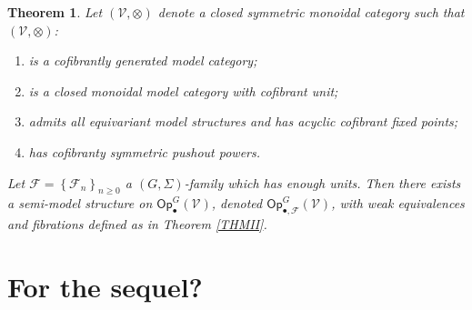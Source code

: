 \documentclass[a4paper,10pt
,draft
]{article}%
\numberwithin{equation}{section}
\numberwithin{figure}{section}
\newtheorem{theorem}[equation]{Theorem}%
\theoremstyle{definition} %
\newcommand{\set}[1]{\left\{#1\right\}}%
\newcommand{\Op}{\mathsf{Op}}%
\newcommand{\F}{\ensuremath{\mathcal F}}
\newcommand{\V}{\ensuremath{\mathcal V}}
\renewcommand{\O}{\ensuremath{\mathcal O}}
\newcommand{\1}{\ensuremath{\mathbbm 1}}%
\begin{document}
\begin{theorem}
      \label{THMII_S}
      Let $(\V,\otimes)$ denote a closed symmetric monoidal category such that
      $(\V, \otimes)$:
      \begin{enumerate}[label = (\roman*)]
      \item is a cofibrantly generated model category;
      \item is a closed monoidal model category with cofibrant unit;
      \item admits all equivariant model structures and has acyclic cofibrant fixed points;
      \item has cofibranty symmetric pushout powers.
      \end{enumerate}
      
      Let $\F = \set{\F_n}_{n \geq 0}$ a $(G, \Sigma)$-family which has enough units.
      Then there exists a semi-model structure on $\Op^G_\bullet(\V)$, denoted $\Op^G_{\bullet,\F}(\V)$,
      with weak equivalences and fibrations defined as in Theorem \ref{THMII}.
\end{theorem}







\section{For the sequel?}
\end{document}
